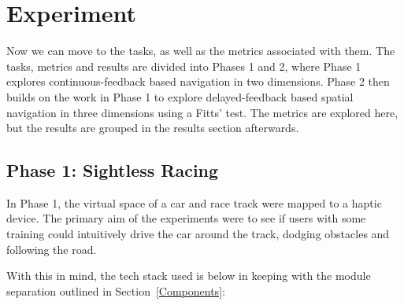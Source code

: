\documentclass[
12pt, %
oneside, %
english, %
doublespacing, %
headsepline, %
]{MastersDoctoralThesis} %
\begin{document}
\chapter{Experiment}
\label{Experiment}

Now we can move to the tasks, as well as the metrics associated with them. The tasks, metrics and results are divided into Phases 1 and 2, where Phase 1 explores continuous-feedback based navigation in two dimensions. Phase 2 then builds on the work in Phase 1 to explore delayed-feedback based spatial navigation in three dimensions using a Fitts' test. The metrics are explored here, but the results are grouped in the results section afterwards.

\section{Phase 1: Sightless Racing}

In Phase 1, the virtual space of a car and race track were mapped to a haptic device. The primary aim of the experiments were to see if users with some training could intuitively drive the car around the track, dodging obstacles and following the road.

With this in mind, the tech stack used is below in keeping with the module separation outlined in Section~\ref{Components}:
\end{document}
